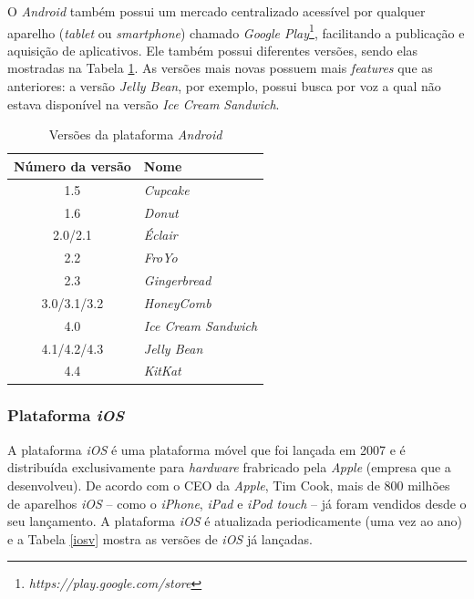	O \textit{Android} também possui um mercado centralizado acessível por qualquer aparelho (\textit{tablet} ou \textit{smartphone}) chamado \textit{Google Play}\footnote{\textit{https://play.google.com/store}}, facilitando a publicação e aquisição de aplicativos. Ele também possui diferentes versões, sendo elas mostradas na Tabela \ref{androidTab}.  As versões mais novas possuem mais \textit{features} que as anteriores: a versão \textit{Jelly Bean}, por exemplo, possui busca por voz a qual não estava disponível na versão \textit{Ice Cream Sandwich}. 

\begin{table}[ht]
	\centering	
	\begin{tabular}{cl}
		\toprule
		\textbf{Número da versão} & \textbf{Nome}  \\
		\midrule
		1.5 &  \textit{Cupcake} \\
		1.6 & \textit{Donut} \\
		2.0/2.1 &  \textit{Éclair} \\
		2.2 & \textit{FroYo} \\
		2.3 &  \textit{Gingerbread} \\
		3.0/3.1/3.2 & \textit{HoneyComb} \\
		4.0 & \textit{Ice Cream Sandwich} \\
		4.1/4.2/4.3 & \textit{Jelly Bean} \\
		4.4 &  \textit{KitKat} \\

		\bottomrule
	\end{tabular}
	\caption{ Versões da plataforma \textit{Android}}
	\label{androidTab}
\end{table}


	\subsubsection{Plataforma \textit{iOS}}

	A plataforma \textit{iOS} é uma plataforma móvel que foi lançada em 2007 e é distribuída exclusivamente para \textit{hardware} frabricado pela \textit{Apple} (empresa que a desenvolveu).  De acordo com o CEO da \textit{Apple}, Tim Cook, mais de 800 milhões de aparelhos \textit{iOS} -- como o \textit{iPhone}, \textit{iPad} e \textit{iPod touch} -- já foram vendidos desde o seu lançamento. A plataforma \textit{iOS} é atualizada periodicamente (uma vez ao ano) e a Tabela \ref{iosv} mostra as versões de \textit{iOS} já lançadas.

